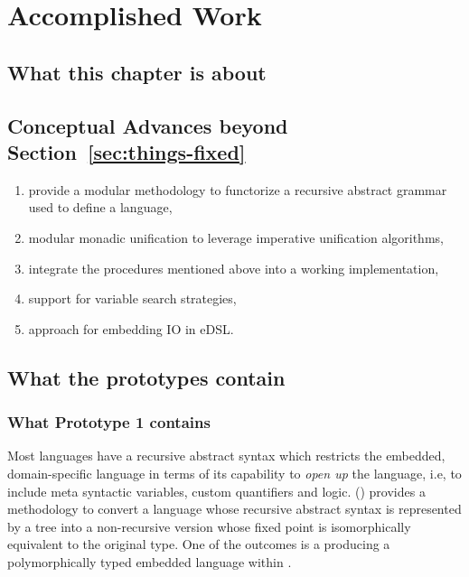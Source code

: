 \documentclass[thesis-solanki.tex]{subfiles}
\begin{document}
\chapter{Accomplished Work}\label{chap:accomplishedWork}

\section{What this chapter is about}\label{sec:what-this-chapter:accomplishedWork}

\section{Conceptual Advances beyond Section~\ref{sec:things-fixed}}\label{sec:advances:accomplishedWork}

\begin{enumerate}
\item provide a modular methodology to functorize a recursive abstract grammar used to define a language,

\item modular monadic unification to leverage imperative unification algorithms,

\item integrate the procedures mentioned above into a working  implementation,

\item support for variable search strategies,

\item approach for embedding IO in eDSL.

\end{enumerate}

\section{What the prototypes contain}
\subsection{What Prototype 1 contains}

Most languages have a recursive abstract syntax which restricts the embedded, domain-specific language
  in terms of its capability to \textit{open up} the language, i.e, to include meta syntactic
  variables, custom quantifiers and logic.
  () provides a methodology to convert a language whose recursive abstract
  syntax is represented by a tree into a non-recursive version whose fixed point is isomorphically equivalent to
  the original type.
  One of the outcomes is a producing a polymorphically typed embedded language within .
\end{document}
